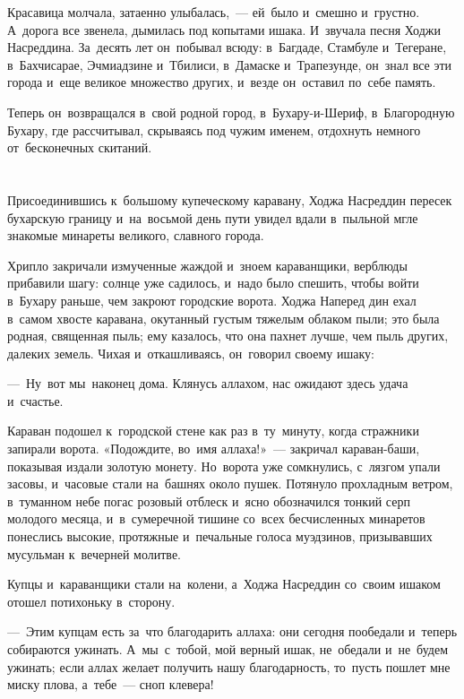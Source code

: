 \documentclass[12pt,a4paper]{book}
\begin{document}
Красавица молчала, затаенно улыбалась,~— ей~было и~смешно и~грустно. А~дорога все звенела, дымилась под копытами ишака. И~звучала песня Ходжи Насреддина. За~десять лет он~побывал всюду: в~Багдаде, Стамбуле и~Тегеране, в~Бахчисарае, Эчмиадзине и~Тбилиси, в~Дамаске и~Трапезунде, он~знал все эти города и~еще великое множество других, и~везде он~оставил по~себе память.

Теперь он~возвращался в~свой родной город, в~Бухару-и-Шериф, в~Благородную Бухару, где рассчитывал, скрываясь под чужим именем, отдохнуть немного от~бесконечных скитаний.


\chapter{}

Присоединившись к~большому купеческому каравану, Ходжа Насреддин пересек бухарскую границу и~на~восьмой день пути увидел вдали в~пыльной мгле знакомые минареты великого, славного города.

Хрипло закричали измученные жаждой и~зноем караванщики, верблюды прибавили шагу: солнце уже садилось, и~надо было спешить, чтобы войти в~Бухару раньше, чем закроют городские ворота. Ходжа Наперед дин ехал в~самом хвосте каравана, окутанный густым тяжелым облаком пыли; это была родная, священная пыль; ему казалось, что она пахнет лучше, чем пыль других, далеких земель. Чихая и~откашливаясь, он~говорил своему ишаку:

—~Ну~вот мы~наконец дома. Клянусь аллахом, нас ожидают здесь удача и~счастье.

Караван подошел к~городской стене как раз в~ту~минуту, когда стражники запирали ворота. «Подождите, во~имя аллаха!»~— закричал караван-баши, показывая издали золотую монету. Но~ворота уже сомкнулись, с~лязгом упали засовы, и~часовые стали на~башнях около пушек. Потянуло прохладным ветром, в~туманном небе погас розовый отблеск и~ясно обозначился тонкий серп молодого месяца, и~в~сумеречной тишине со~всех бесчисленных минаретов понеслись высокие, протяжные и~печальные голоса муэдзинов, призывавших мусульман к~вечерней молитве.

Купцы и~караванщики стали на~колени, а~Ходжа Насреддин со~своим ишаком отошел потихоньку в~сторону.

—~Этим купцам есть за~что благодарить аллаха: они сегодня пообедали и~теперь собираются ужинать. А~мы~с~тобой, мой верный ишак, не~обедали и~не~будем ужинать; если аллах желает получить нашу благодарность, то~пусть пошлет мне миску плова, а~тебе~— сноп клевера!
\end{document}
